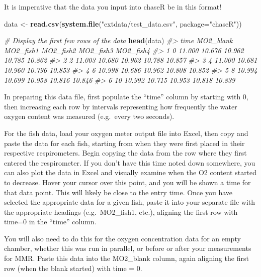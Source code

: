 \documentclass[
]{article}
\newenvironment{Shaded}{\begin{snugshade}}{\end{snugshade}}
\newcommand{\AttributeTok}[1]{\textcolor[rgb]{0.13,0.29,0.53}{#1}}
\newcommand{\CommentTok}[1]{\textcolor[rgb]{0.56,0.35,0.01}{\textit{#1}}}
\newcommand{\FunctionTok}[1]{\textcolor[rgb]{0.13,0.29,0.53}{\textbf{#1}}}
\newcommand{\NormalTok}[1]{#1}
\newcommand{\OtherTok}[1]{\textcolor[rgb]{0.56,0.35,0.01}{#1}}
\newcommand{\StringTok}[1]{\textcolor[rgb]{0.31,0.60,0.02}{#1}}
\begin{document}
It is imperative that the data you input into chaseR be in this format!

\begin{Shaded}
\begin{Highlighting}[]
\NormalTok{data }\OtherTok{\textless{}{-}} \FunctionTok{read.csv}\NormalTok{(}\FunctionTok{system.file}\NormalTok{(}\StringTok{"extdata/test\_data.csv"}\NormalTok{, }\AttributeTok{package=}\StringTok{"chaseR"}\NormalTok{))}

\CommentTok{\# Display the first few rows of the data}
\FunctionTok{head}\NormalTok{(data)}
\CommentTok{\#\textgreater{}   time MO2\_blank MO2\_fish1 MO2\_fish2 MO2\_fish3 MO2\_fish4}
\CommentTok{\#\textgreater{} 1    0    11.000    10.676    10.962    10.785    10.862}
\CommentTok{\#\textgreater{} 2    2    11.003    10.680    10.962    10.788    10.857}
\CommentTok{\#\textgreater{} 3    4    11.000    10.681    10.960    10.796    10.853}
\CommentTok{\#\textgreater{} 4    6    10.998    10.686    10.962    10.808    10.852}
\CommentTok{\#\textgreater{} 5    8    10.994    10.699    10.958    10.816    10.846}
\CommentTok{\#\textgreater{} 6   10    10.992    10.715    10.953    10.818    10.839}
\end{Highlighting}
\end{Shaded}

In preparing this data file, first populate the ``time'' column by
starting with 0, then increasing each row by intervals representing how
frequently the water oxygen content was measured (e.g.~every two
seconds).

For the fish data, load your oxygen meter output file into Excel, then
copy and paste the data for each fish, starting from when they were
first placed in their respective respirometers. Begin copying the data
from the row where they first entered the respirometer. If you don't
have this time noted down somewhere, you can also plot the data in Excel
and visually examine when the O2 content started to decrease. Hover your
cursor over this point, and you will be shown a time for that data
point. This will likely be close to the entry time. Once you have
selected the appropriate data for a given fish, paste it into your
separate file with the appropriate headings (e.g.~MO2\_fish1, etc.),
aligning the first row with time=0 in the ``time'' column.

You will also need to do this for the oxygen concentration data for an
empty chamber, whether this was run in parallel, or before or after your
measurements for MMR. Paste this data into the MO2\_blank column, again
aligning the first row (when the blank started) with time = 0.
\end{document}
